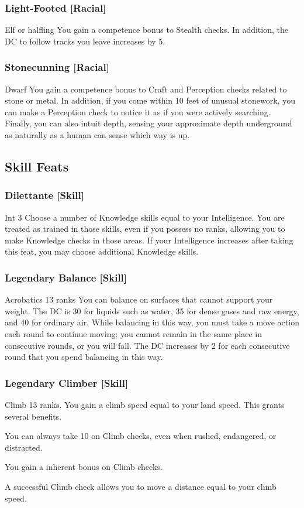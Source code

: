\subsubsection{Light-Footed [Racial]}
 Elf or halfling
 You gain a  competence bonus to Stealth checks. In addition, the DC to follow tracks you leave increases by 5.

\subsubsection{Stonecunning [Racial]}
 Dwarf
 You gain a  competence bonus to Craft and Perception checks related to stone or metal. In addition, if you come within 10 feet of unusual stonework, you can make a Perception check to notice it as if you were actively searching. Finally, you can also intuit depth, sensing your approximate depth underground as naturally as a human can sense which way is up.

\subsection{Skill Feats}

\subsubsection{Dilettante [Skill]}
 Int 3
 Choose a number of Knowledge skills equal to your Intelligence. You are treated as trained in those skills, even if you possess no ranks, allowing you to make Knowledge checks in those areas. If your Intelligence increases after taking this feat, you may choose additional Knowledge skills.

\subsubsection{Legendary Balance [Skill]}
\featpre Acrobatics 13 ranks
\featben You can balance on surfaces that cannot support your weight. The DC is 30 for liquids such as water, 35 for dense gases and raw energy, and 40 for ordinary air. While balancing in this way, you must take a move action each round to continue moving; you cannot remain in the same place in consecutive rounds, or you will fall. The DC increases by 2 for each consecutive round that you spend balancing in this way.

\subsubsection{Legendary Climber [Skill]}
\featpre Climb 13 ranks.
\featben You gain a climb speed equal to your land speed. This grants several benefits. 
\begin{itemize*}
  \item You can always take 10 on Climb checks, even when rushed, endangered, or distracted. 
  \item You gain a  inherent bonus on Climb checks.
  \item A successful Climb check allows you to move a distance equal to your climb speed.
\end{itemize*}

